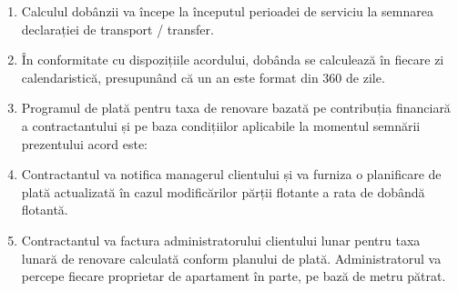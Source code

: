 \begin{enumerate}
\item Calculul dobânzii va începe la începutul perioadei de serviciu la semnarea declarației de transport / transfer.

\item În conformitate cu dispozițiile acordului, dobânda se calculează în fiecare zi calendaristică, presupunând că un an este format din 360 de zile.

\item Programul de plată pentru taxa de renovare bazată pe contribuția financiară a contractantului și pe baza condițiilor aplicabile la momentul semnării prezentului acord este:


\begin{center}
\end{center}


\item Contractantul va notifica managerul clientului și va furniza o planificare de plată actualizată în cazul modificărilor părții flotante a rata de dobândă flotantă.

\item Contractantul va factura administratorului clientului lunar pentru taxa lunară de renovare calculată conform planului de plată. Administratorul va percepe fiecare proprietar de apartament în parte, pe bază de metru pătrat.

\end{enumerate}
